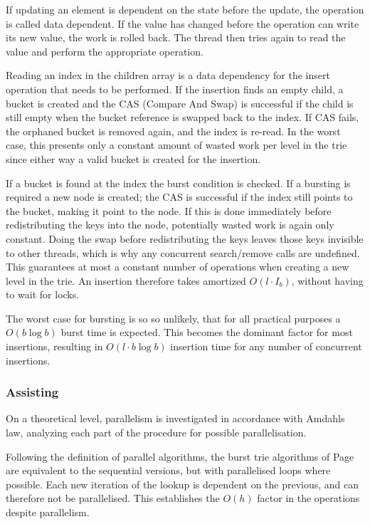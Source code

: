 If updating an element is dependent on the state before the update, the operation
is called data dependent. If the value has changed before the operation can write
its new value, the work is rolled back. The thread then tries again to read the
value and perform the appropriate operation.

Reading an index in the children array is a data dependency for the insert
operation that needs to be performed. If the insertion finds an empty child,
a bucket is created and the CAS (Compare And Swap) is successful if
the child is still empty when the bucket reference is swapped back to the
index. If CAS fails, the orphaned bucket is removed again, and the index is
re-read. In the worst case, this presents only a constant amount of wasted work
per level in the trie since either way a valid bucket is created for the
insertion.

If a bucket is found at the index the burst condition is checked. If a bursting
is required a new node is created; the CAS is successful if the index
still points to the bucket, making it point to the node. If this is done
immediately before redistributing the keys into the node, potentially wasted
work is again only constant. Doing the swap before redistributing the
keys leaves those keys invisible to other threads, which is why any concurrent
search/remove calls are undefined. This guarantees at most a constant
number of operations when creating a new level in the trie. An insertion
therefore takes amortized $O(l\cdot I_b)$, without having to wait for locks.

The worst case for bursting is so so unlikely, that for all practical purposes
a $O(b \log b)$ burst time is expected. This becomes the dominant factor for most
insertions, resulting in $O(l \cdot b \log b)$ insertion time for any number of concurrent
insertions.

\subsubsection{Assisting}
On a theoretical level, parallelism is investigated in accordance with Amdahls
law, analyzing each part of the procedure for possible parallelisation.

Following the definition of parallel algorithms, the burst trie algorithms of
Page \pageref{alg:bt_insert} are equivalent to the sequential versions, but
with parallelised loops where possible. Each new iteration of the lookup
is dependent on the previous, and can therefore not be parallelised. This
establishes the $O(h)$ factor in the operations despite parallelism.

